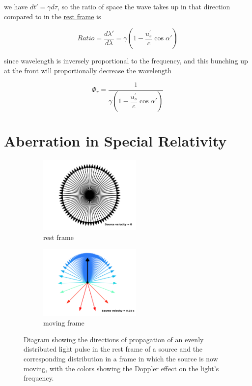 we have $dt{'}={\gamma} d\tau$, so the ratio of space the wave takes up in that direction compared to in the \hyperlink{def-proper-frame}{rest frame} is

\begin{equation}
	Ratio = \frac{d\lambda'}{d\lambda} = {\gamma} \left(1-\dfrac{u_{s}^{'}}{c} \cos\alpha{'} \right)
\end{equation}

since wavelength is inversely proportional to the frequency, and this bunching up at the front will proportionally decrease the wavelength

\begin{equation}
	\Phi_{r} = \frac{1}{ {\gamma} \left(1-\dfrac{u_{s}^{'}}{c} \cos\alpha{'} \right)}
\end{equation}

\section{Aberration in Special Relativity}

\begin{figure}[ht]
	\begin{subfigure}{.49\textwidth}
		\centering
		\includegraphics[width=5cm]{images/pdf/Aberrated_velocities_restframe.pdf}
		\caption{rest frame}
	\end{subfigure}
	\begin{subfigure}{.49\textwidth}
		\centering
		\includegraphics[width=5cm]{images/pdf/Aberrated_velocities.pdf}
		\caption{moving frame}
	\end{subfigure}
	\caption{Diagram showing the directions of propagation of an evenly distributed light pulse in the rest frame of a source and the corresponding distribution in a frame in which the source is now moving, with the colors showing the Doppler effect on the light's frequency.}
	\label{fig: aberrated emitted light}
\end{figure}

